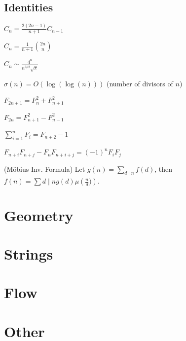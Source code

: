 \subsection{Identities}
{
	$C_n = \frac{2(2n-1)}{n+1} C_{n-1}$

	$C_n = \frac{1}{n+1} \binom{2n}{n}$

	$C_n \sim \frac{4^n}{n^{3/2}\sqrt{\pi}}$

	$\sigma(n) = O(\log(\log(n)))$ (number of divisors of $n$)

	$F_{2n+1} = F_{n}^2 + F_{n+1}^2$

	$F_{2n} = F_{n+1}^2 - F_{n-1}^2$

	$\sum_{i=1}^n F_i = F_{n+2}-1$

	$F_{n+i}F_{n+j} - F_nF_{n+i+j} = (-1)^n F_iF_j$

	(Möbius Inv. Formula)
	Let $g(n) = \sum_{d\mid n} f(d)$, then $f(n)=\sum{d\mid n} g(d) \mu\left(\frac{n}{d})\right)$.
}

\section{Geometry}
\section{Strings}

\section{Flow}

\section{Other}


